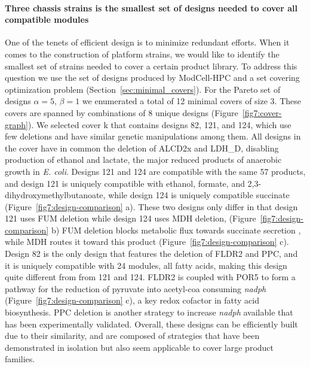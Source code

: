 {%

\paragraph{Three chassis strains is the smallest set of designs needed to cover all compatible modules}
One of the tenets of efficient design is to minimize redundant efforts.
When it comes to the construction of platform strains, we would like to identify the smallest set of strains needed to cover a certain product library.  %
To address this question we use the set of designs produced by ModCell-HPC and a set covering optimization problem (Section~\ref{sec:minimal_covers}).
For the Pareto set of designs $\alpha=5,\,\beta=1$ we  enumerated a total of 12 minimal covers of size 3. These covers are spanned by combinations of 8 unique designs (Figure~\ref{fig7:cover-graph}). %
We selected cover k that contains designs 82, 121, and 124, which use few deletions and have similar genetic manipulations among them.
All designs in the cover have in common the deletion of ALCD2x and LDH\_D, disabling production of ethanol and lactate, the major reduced products of anaerobic growth in \textit{E. coli}.
Designs 121 and 124 are compatible with the same 57 products, and design 121 is uniquely compatible with ethanol, formate, and 2,3-dihydroxymethylbutanoate, while design 124 is uniquely compatible succinate (Figure~\ref{fig7:design-comparison} a).
These two designs only differ in that design 121 uses FUM deletion while design 124 uses MDH deletion,
(Figure~\ref{fig7:design-comparison} b)
FUM deletion blocks metabolic flux towards succinate secretion%
, while MDH routes it toward this product (Figure~\ref{fig7:design-comparison} c).
Design 82 is the only design that features the deletion of FLDR2 and PPC, and it is uniquely compatible with 24 modules, all fatty acids, making this design quite different from from 121 and 124.
FLDR2 is coupled with POR5 to form a pathway for the reduction of pyruvate into acetyl-coa consuming \textit{nadph} (Figure~\ref{fig7:design-comparison} c), a key redox cofactor in fatty acid biosynthesis.
PPC deletion is another strategy to increase \textit{nadph} available that has been experimentally validated. \citep{chemler2010}
Overall, these designs can be efficiently built due to their similarity,  and are composed of strategies that have been demonstrated in isolation but also seem applicable to cover large product families.

}
